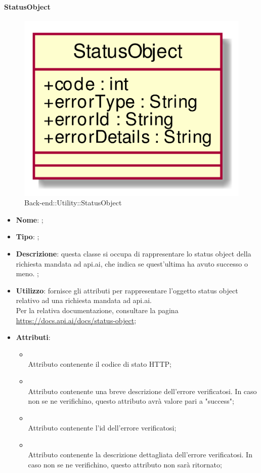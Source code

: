 \hypertarget{StatusObject_label}{\paragraph{StatusObject}}
\begin{figure}[h]
	\centering
	\includegraphics[width=\textwidth,height=\textheight,keepaspectratio]{images/ClassStatusObject.png}
	\caption{Back-end::Utility::StatusObject}
\end{figure}
\begin{itemize}
	\item \textbf{Nome}: ;
	\item \textbf{Tipo}: ;
	\item \textbf{Descrizione}: questa classe si occupa di rappresentare lo status object della richiesta mandata ad api.ai, che indica se quest'ultima ha avuto successo o meno.
;
	\item \textbf{Utilizzo}: fornisce gli attributi per rappresentare l'oggetto status object relativo ad una richiesta mandata ad api.ai. \\
Per la relativa documentazione, consultare la pagina \url{https://docs.api.ai/docs/status-object};
	\item \textbf{Attributi}:
	\begin{itemize}
		\item[]  \\
		Attributo contenente il codice di stato HTTP;
		\item[]  \\
		Attributo contenente una breve descrizione dell'errore verificatosi. In caso non se ne verifichino, questo attributo avrà valore pari a "success";
		\item[]  \\
		Attributo contenente l'id dell'errore verificatosi;
		\item[]  \\
		Attributo contenente la descrizione dettagliata dell'errore verificatosi. In caso non se ne verifichino, questo attributo non sarà ritornato;
	\end{itemize}
\end{itemize}
\FloatBarrier

